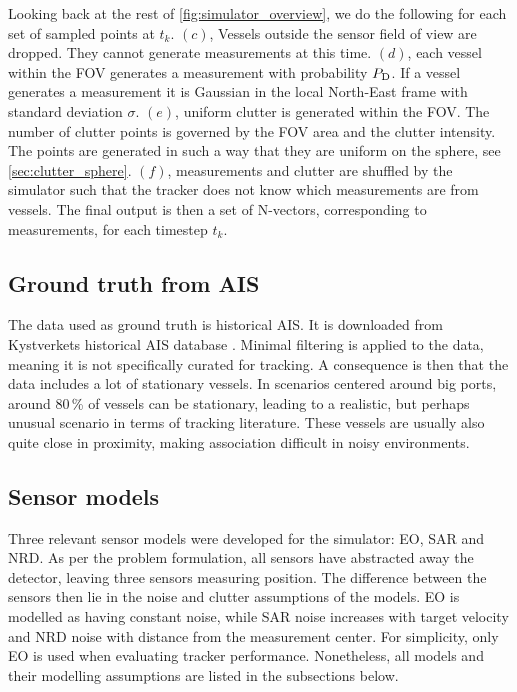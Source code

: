Looking back at the rest of \autoref{fig:simulator_overview}, we do the following for each set of sampled points at $t_k$. $(c)$, Vessels outside the sensor field of view are dropped. They cannot generate measurements at this time. $(d)$, each vessel within the FOV generates a measurement with probability $P_{\mathrm{D}}$. If a vessel generates a measurement it is Gaussian in the local North-East frame with standard deviation $\sigma$. $(e)$, uniform clutter is generated within the FOV. The number of clutter points is governed by the FOV area and the clutter intensity. The points are generated in such a way that they are uniform on the sphere, see \autoref{sec:clutter_sphere}. $(f)$, measurements and clutter are shuffled by the simulator such that the tracker does not know which measurements are from vessels. The final output is then a set of N-vectors, corresponding to measurements, for each timestep $t_k$.

\subsection{Ground truth from AIS}
\label{sec:sim-truth}

The data used as ground truth is historical AIS. It is downloaded from Kystverkets historical AIS database \cite{kystverket}. Minimal filtering is applied to the data, meaning it is not specifically curated for tracking. A consequence is then that the data includes a lot of stationary vessels. In scenarios centered around big ports, around 80\,\% of vessels can be stationary, leading to a realistic, but perhaps unusual scenario in terms of tracking literature. These vessels are usually also quite close in proximity, making association difficult in noisy environments. 

\subsection{Sensor models}
\label{sec:sim-sensors}

Three relevant sensor models were developed for the simulator: EO, SAR and NRD. As per the problem formulation, all sensors have abstracted away the detector, leaving three sensors measuring position. The difference between the sensors then lie in the noise and clutter assumptions of the models. EO is modelled as having constant noise, while SAR noise increases with target velocity and NRD noise with distance from the measurement center. For simplicity, only EO is used when evaluating tracker performance. Nonetheless, all models and their modelling assumptions are listed in the subsections below.
\medskip

